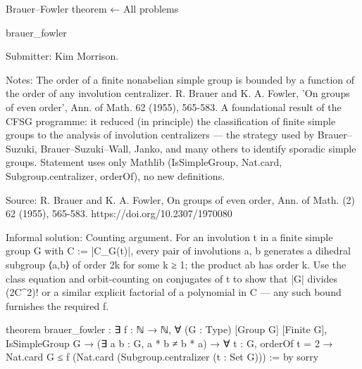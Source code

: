 Brauer–Fowler theorem
← All problems

brauer_fowler

Submitter: Kim Morrison.

Notes: The order of a finite nonabelian simple group is bounded by a function of the order of any involution centralizer. R. Brauer and K. A. Fowler, 'On groups of even order', Ann. of Math. 62 (1955), 565-583. A foundational result of the CFSG programme: it reduced (in principle) the classification of finite simple groups to the analysis of involution centralizers — the strategy used by Brauer–Suzuki, Brauer–Suzuki–Wall, Janko, and many others to identify sporadic simple groups. Statement uses only Mathlib (IsSimpleGroup, Nat.card, Subgroup.centralizer, orderOf), no new definitions.

Source: R. Brauer and K. A. Fowler, On groups of even order, Ann. of Math. (2) 62 (1955), 565-583. https://doi.org/10.2307/1970080

Informal solution: Counting argument. For an involution t in a finite simple group G with C := |C_G(t)|, every pair of involutions a, b generates a dihedral subgroup ⟨a,b⟩ of order 2k for some k ≥ 1; the product ab has order k. Use the class equation and orbit-counting on conjugates of t to show that |G| divides (2C^2)! or a similar explicit factorial of a polynomial in C — any such bound furnishes the required f.

theorem brauer_fowler :
    ∃ f : ℕ → ℕ, ∀ (G : Type) [Group G] [Finite G],
      IsSimpleGroup G → (∃ a b : G, a * b ≠ b * a) →
      ∀ t : G, orderOf t = 2 →
        Nat.card G ≤ f (Nat.card (Subgroup.centralizer ({t} : Set G))) := by
  sorry
